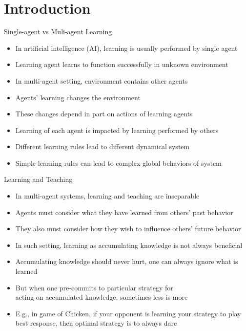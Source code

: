 \documentclass[11pt,aspectratio=169]{beamer}
\subtitle{\vspace{2.1em}Lecture 9: Learning in Games}
\begin{document}
 \begin{frame}[plain]
  \titlepage
 \end{frame} 
 
 \section{Introduction}
 
  \begin{frame}{Single-agent vs Muli-agent Learning}
   \begin{itemize}[<+->]
   \setlength{\itemsep}{0.7em}
    \item In artificial intelligence (AI), learning is usually performed by \alert{single agent}
    \item Learning agent learns to function successfully in \alert{unknown environment}
    \item In multi-agent setting, environment contains other agents
    \item Agents' learning changes the environment
    \item These changes \alert{depend} in part on actions of learning agents
    \item Learning of each agent is \alert{impacted} by learning performed by others
    \item Different learning rules lead to different \alert{dynamical system}
    \item Simple learning rules can lead to complex global behaviors of system
   \end{itemize}
  \end{frame}
  
  
  \begin{frame}{Learning and Teaching}
   \begin{itemize}[<+->]
   \setlength{\itemsep}{0.5em}
    \item In multi-agent systems, learning and teaching are inseparable
    \item Agents must consider what they have \alert{learned} from others' past behavior
    \item They also must consider how they wish to \alert{influence} others' future behavior
    \item In such setting, learning as \alert{accumulating knowledge} is not always beneficial
    \item Accumulating knowledge should never hurt, one can always ignore what is learned
    \item But when one pre-commits to particular strategy for \\acting on accumulated knowledge, sometimes less is more
    \item E.g., in game of Chicken, if your opponent is learning your strategy to play best response, then optimal strategy is to always dare
   \end{itemize}
  \end{frame}
  
\end{document}

